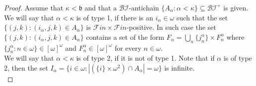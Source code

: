 \documentclass[a4paper]{amsart}
\newcommand{\bbb}{\mathfrak{b}}
\newcommand{\FF}{\mathcal{F}in\times\mathcal{F}in}
\newcommand{\BI}{\mathcal{BI}}
\begin{document}
\begin{proof}
    Assume that $\kappa<\bbb$ and that a $\BI$-antichain $\{A_{\alpha}:\alpha<\kappa\}\subseteq\BI^{+}$ is given.\\
    We will say that $\alpha<\kappa$ is of type 1, if there is an $i_{\alpha}\in\omega$ such that the set $\{(j,k):(i_{\alpha},j,k)\in A_{\alpha}\}$ is $\FF$-positive. In such case the set $\{(j,k):(i_{\alpha},j,k)\in A_{\alpha}\}$ contains a set of the form $F_{\alpha}=\bigcup_{n}\{j^{\alpha}_{n}\}\times F^{\alpha}_{n}$ where $\{j^{\alpha}_{n}:n\in\omega\}\in[\omega]^{\omega}$ and $F^{\alpha}_{n}\in[\omega]^{\omega}$ for every $n\in\omega$.\\
    We will say that $\alpha<\kappa$ is of type 2, if it is not of type 1. Note that if $\alpha$ is of type 2, then the set $I_{\alpha}=\{i\in\omega:|(\{i\}\times\omega^{2})\cap A_{\alpha}|=\omega\}$ is infinite.\\
    

\end{proof}
\end{document}
